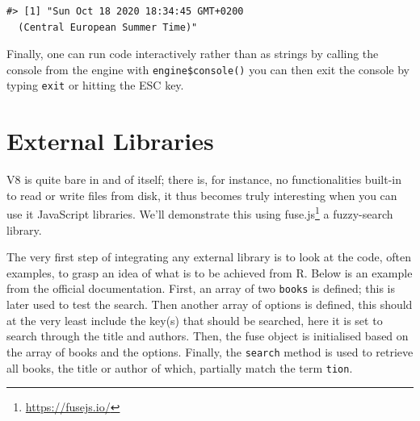 \documentclass[
  10pt,
]{krantz}
\makeatletter
\newenvironment{Shaded}{\begin{snugshade}}{\end{snugshade}}
\newcommand{\CommentTok}[1]{\textcolor[rgb]{0.37,0.37,0.37}{\textit{#1}}}
\newcommand{\KeywordTok}[1]{\textcolor[rgb]{0.27,0.27,0.27}{\textbf{#1}}}
\newcommand{\NormalTok}[1]{#1}
\newcommand{\OperatorTok}[1]{\textcolor[rgb]{0.43,0.43,0.43}{\textbf{#1}}}
\newcommand{\StringTok}[1]{\textcolor[rgb]{0.5,0.5,0.5}{#1}}
\renewcommand{\href}[2]{#2\footnote{\url{#1}}}
\newenvironment{kframe}{%
\medskip{}
\setlength{\fboxsep}{.8em}
 \def\at@end@of@kframe{}%
 \ifinner\ifhmode%
  \def\at@end@of@kframe{\end{minipage}}%
  \begin{minipage}{\columnwidth}%
 \fi\fi%
 \def\FrameCommand##1{\hskip\@totalleftmargin \hskip-\fboxsep
 \colorbox{shadecolor}{##1}\hskip-\fboxsep
     \hskip-\linewidth \hskip-\@totalleftmargin \hskip\columnwidth}%
 \MakeFramed {\advance\hsize-\width
   \@totalleftmargin\z@ \linewidth\hsize
   \@setminipage}}%
 {\par\unskip\endMakeFramed%
 \at@end@of@kframe}
\renewenvironment{Shaded}{\begin{kframe}}{\end{kframe}}
\makeatother
\begin{document}
\begin{Shaded}
\end{Shaded}

\begin{verbatim}
#> [1] "Sun Oct 18 2020 18:34:45 GMT+0200 
  (Central European Summer Time)"
\end{verbatim}

Finally, one can run code interactively rather than as strings by calling the console from the engine with \texttt{engine\$console()} you can then exit the console by typing \texttt{exit} or hitting the ESC key.

\hypertarget{v8-external}{%
\section{External Libraries}\label{v8-external}}

V8 is quite bare in and of itself; there is, for instance, no functionalities built-in to read or write files from disk, it thus becomes truly interesting when you can use it JavaScript libraries. We'll demonstrate this using \href{https://fusejs.io/}{fuse.js} a fuzzy-search library.

The very first step of integrating any external library is to look at the code, often examples, to grasp an idea of what is to be achieved from R. Below is an example from the official documentation. First, an array of two \texttt{books} is defined; this is later used to test the search. Then another array of options is defined, this should at the very least include the key(s) that should be searched, here it is set to search through the title and authors. Then, the fuse object is initialised based on the array of books and the options. Finally, the \texttt{search} method is used to retrieve all books, the title or author of which, partially match the term \texttt{tion}.
\end{document}
